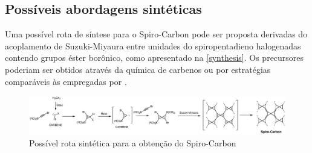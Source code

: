 	\subsection{Possíveis abordagens sintéticas}
	
	Uma possível rota de síntese para o Spiro-Carbon pode ser proposta derivadas do acoplamento de Suzuki-Miyaura entre unidades do spiropentadieno halogenadas contendo grupos éster borônico, como apresentado na \autoref{synthesis}. Os precursores poderiam ser obtidos através da química de carbenos ou por estratégias comparáveis às empregadas por \citeauthor{billups1991spiropentadiene}.
	
	\begin{figure}[!ht]
		\centering
		\includegraphics[width=1.\linewidth]{capitulos/fig/results1/synthesis_polyspiro1.eps}
		\caption{Possível rota sintética para a obtenção do Spiro-Carbon}
		\label{synthesis}
	\end{figure}


